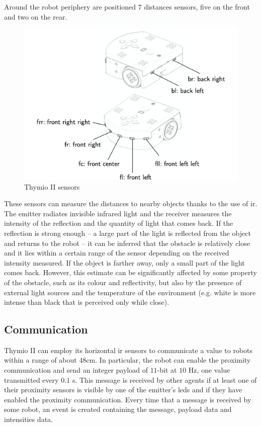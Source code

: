 Around the robot periphery are positioned $7$ distances sensors, five on the 
front and two on the rear. 
\begin{figure}[h!tb]
	\centering
	\includegraphics[width=.6\textwidth]{contents/images/thymio2x}
	\caption{Thymio II sensors}
	\label{fig:thymio sensors}
\end{figure}
These sensors can measure the distances to nearby objects thanks to the use 
of  \gls{ir}. The emitter radiates invisible infrared light and the receiver 
measures the intensity of the reflection and the quantity of light that comes 
back.
If the reflection is strong enough – a large part of the light is reflected from 
the object and returns to the robot – it can be inferred that the obstacle is 
relatively close and it lies within a certain range of the sensor depending on 
the received intensity measured. If the object is farther away, only a small 
part of the light comes back.
However, this estimate can be significantly affected by some property of the 
obstacle, such as its colour and reflectivity, but also by the presence of 
external light sources and the temperature of the environment (e.g. white is 
more intense than black that is perceived only while close).

\subsection{Communication}
\label{subsec:thymiocomm}

Thymio II can employ its horizontal \gls{ir} sensors to communicate a value 
to robots within a range of about $48$\gls{cm}. 
In particular, the robot can enable the proximity communication and send an 
integer payload of $11$-bit at $10$ \gls{Hz}, one value transmitted every $0.1$ 
\gls{s}. 
This message is received by other agents if at least one of their proximity sensors 
is visible by one of the emitter’s \glspl{led} and if they have enabled the proximity 
communication.
Every time that a message is received by some robot, an event is 
created containing the message, payload data and intensities data.

